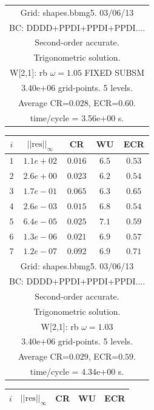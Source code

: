 \begin{table}[hbt]
\begin{center}
{\begin{tabular}{|c|c|c|c|c|}
\hline 
\multicolumn{5}{|c|}{Grid: shapes.bbmg5. 03/06/13}  \\
\multicolumn{5}{|c|}{BC: DDDD+PPDI+PPDI+PPDI....}  \\
\multicolumn{5}{|c|}{Second-order accurate.}  \\
\multicolumn{5}{|c|}{Trigonometric solution.}  \\
\multicolumn{5}{|c|}{W[2,1]: rb $\omega=1.05$ FIXED SUBSM}  \\
\multicolumn{5}{|c|}{3.40e+06 grid-points. 5 levels.}  \\
\multicolumn{5}{|c|}{Average CR=$0.028$, ECR=$0.60$.}  \\
\multicolumn{5}{|c|}{time/cycle = 3.56e+00 s.}  \\
\hline 
\end{tabular}
\begin{tabular}{|c|c|c|c|c|} \hline 
 $i$   & $\vert\vert\mbox{res}\vert\vert_\infty$  &  CR     &  WU    & ECR  \\   \hline 
 $ 1$  & $ 1.1e+02$ & $0.016$ & $ 6.5$ & $0.53$ \\ 
 $ 2$  & $ 2.6e+00$ & $0.023$ & $ 6.2$ & $0.54$ \\ 
 $ 3$  & $ 1.7e-01$ & $0.065$ & $ 6.3$ & $0.65$ \\ 
 $ 4$  & $ 2.6e-03$ & $0.015$ & $ 6.8$ & $0.54$ \\ 
 $ 5$  & $ 6.4e-05$ & $0.025$ & $ 7.1$ & $0.59$ \\ 
 $ 6$  & $ 1.3e-06$ & $0.021$ & $ 6.9$ & $0.57$ \\ 
 $ 7$  & $ 1.2e-07$ & $0.092$ & $ 6.9$ & $0.71$ \\ 
\hline 
\multicolumn{5}{|c|}{Grid: shapes.bbmg5. 03/06/13}  \\
\multicolumn{5}{|c|}{BC: DDDD+PPDI+PPDI+PPDI....}  \\
\multicolumn{5}{|c|}{Second-order accurate.}  \\
\multicolumn{5}{|c|}{Trigonometric solution.}  \\
\multicolumn{5}{|c|}{W[2,1]: rb $\omega=1.03$}  \\
\multicolumn{5}{|c|}{3.40e+06 grid-points. 5 levels.}  \\
\multicolumn{5}{|c|}{Average CR=$0.029$, ECR=$0.59$.}  \\
\multicolumn{5}{|c|}{time/cycle = 4.34e+00 s.}  \\
\hline 
\end{tabular}
\begin{tabular}{|c|c|c|c|c|} \hline 
 $i$   & $\vert\vert\mbox{res}\vert\vert_\infty$  &  CR     &  WU    & ECR  \\   \hline 

\end{tabular}}
\end{center}
\end{table}
